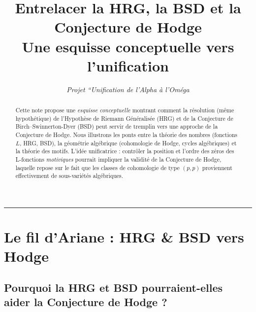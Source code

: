\documentclass[11pt]{article}
\title{\textbf{Entrelacer la HRG, la BSD et la Conjecture de Hodge}\\
\large{Une esquisse conceptuelle vers l'unification}}
\author{\textit{Projet “Unification de l’Alpha à l’Oméga}}
\date{}
\begin{document}
\maketitle

\begin{abstract}
Cette note propose une \emph{esquisse conceptuelle} montrant comment la résolution (même hypothétique) de l'Hypothèse de Riemann Généralisée (HRG) et de la Conjecture de Birch--Swinnerton-Dyer (BSD) peut servir de tremplin vers une approche de la Conjecture de Hodge. Nous illustrons les ponts entre la théorie des nombres (fonctions $L$, HRG, BSD), la géométrie algébrique (cohomologie de Hodge, cycles algébriques) et la théorie des motifs. L'idée unificatrice : contrôler la position et l'ordre des zéros des L-fonctions \emph{motiviques} pourrait impliquer la validité de la Conjecture de Hodge, laquelle repose sur le fait que les classes de cohomologie de type $(p,p)$ proviennent effectivement de sous-variétés algébriques.
\end{abstract}

\hrule
\vspace{6pt}

\section{Le fil d'Ariane : HRG \& BSD vers Hodge}

\subsection{Pourquoi la HRG et BSD pourraient-elles aider la Conjecture de Hodge ?}
\end{document}
